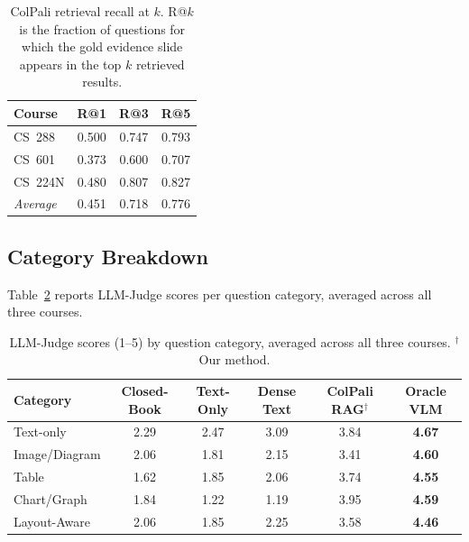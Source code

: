 \documentclass{article} %
\begin{document}
\begin{table}[htbp]
\caption{ColPali retrieval recall at $k$. R@$k$ is the fraction of questions for which the gold evidence slide appears in the top $k$ retrieved results.}
\label{tab:recall}
\begin{center}
\begin{tabular}{lccc}
\toprule
\textbf{Course} & \textbf{R@1} & \textbf{R@3} & \textbf{R@5} \\
\midrule
CS~288  & 0.500 & 0.747 & 0.793 \\
CS~601  & 0.373 & 0.600 & 0.707 \\
CS~224N & 0.480 & 0.807 & 0.827 \\
\midrule
\textit{Average} & 0.451 & 0.718 & 0.776 \\
\bottomrule
\end{tabular}
\end{center}
\end{table}

\subsection{Category Breakdown}

Table~\ref{tab:category} reports LLM-Judge scores per question category, averaged across all three courses.

\begin{table}[htbp]
\caption{LLM-Judge scores (1--5) by question category, averaged across all three courses. $^\dagger$Our method.}
\label{tab:category}
\begin{center}
\begin{tabular}{lccccc}
\toprule
\textbf{Category} & \textbf{Closed-Book} & \textbf{Text-Only} & \textbf{Dense Text} & \textbf{ColPali RAG}$^\dagger$ & \textbf{Oracle VLM} \\
\midrule
Text-only     & 2.29 & 2.47 & 3.09 & 3.84 & \textbf{4.67} \\
Image/Diagram & 2.06 & 1.81 & 2.15 & 3.41 & \textbf{4.60} \\
Table         & 1.62 & 1.85 & 2.06 & 3.74 & \textbf{4.55} \\
Chart/Graph   & 1.84 & 1.22 & 1.19 & 3.95 & \textbf{4.59} \\
Layout-Aware  & 2.06 & 1.85 & 2.25 & 3.58 & \textbf{4.46} \\
\bottomrule
\end{tabular}
\end{center}
\end{table}
\end{document}
